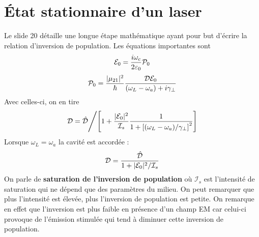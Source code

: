 \section{État stationnaire d'un laser}
Le slide 20 détaille une longue étape mathématique ayant pour but d'écrire la relation d'inversion
de population. Les équations importantes sont
\begin{equation}
[{K_c}/2 - i({\omega _L} - {\omega _c})]{{\cal E}_0} = \frac{{i{\omega _c}}}{{2{\varepsilon _0}}}{{\cal P}_0}
\label{eq:3prim}
\end{equation}
\begin{equation}
{{\cal P}_0} = \frac{{|{\mu _{21}}{|^2}}}{\hbar }\frac{{{\cal D}{{\cal E}_0}}}{{({\omega _L} - {\omega _a}) + i{\gamma _ \bot }}}
\label{eq:4prim}
\end{equation}
Avec celles-ci, on en tire
\begin{equation}
{{\cal D}} = {{{\hat {\cal D}}} \mathord{\left/
 {\vphantom {{{\hat {\cal D}}} {\left[ {1 + \frac{{|{{\cal E}_0}{|^2}}}{{{{{\cal I}}_s}}}\frac{1}{{1 + {{[({\omega _L} - {\omega _a})/{\gamma _ \bot }]}^2}}}} \right]}}} \right.
 \kern-\nulldelimiterspace} {\left[ {1 + \frac{{|{{\cal E}_0}{|^2}}}{{{{{\cal I}}_s}}}\frac{1}{{1 + {{[({\omega _L} - {\omega _a})/{\gamma _ \bot }]}^2}}}} \right]}}
\label{eq:5prim}
\end{equation}
Lorsque $\omega_L=\omega_a$ la cavité est accordée :
\begin{equation}
{{\cal D}} = \frac{{{\hat {\cal D}}}}{{1 + |{{\cal E}_0}{|^2}/{{{\cal I}}_s}}}
\end{equation}
On parle de \textbf{saturation de l'inversion de population} où $\mathcal{I}_s$ est l'intensité de 
saturation qui ne dépend que des paramètres du milieu. On peut remarquer que plus l'intensité est 
élevée, plus l'inversion de population est petite. On remarque en effet que l'inversion est plus 
faible en présence d'un champ EM car celui-ci provoque de l'émission stimulée qui tend à diminuer
cette inversion de population. 

